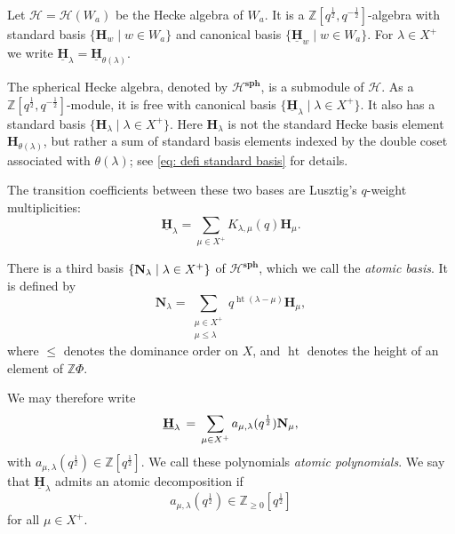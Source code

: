 Let $\mathcal{H}=\mathcal{H}(W_a)$ be the Hecke algebra of $W_a$. It is a $\mathbb{Z}[q^{\frac{1}{2}},q^{-\frac{1}{2}}]$-algebra with standard basis $\{\mathbf{H}_w\mid w\in W_a\}$ and canonical basis $\{\underline{\mathbf{H}}_w\mid w\in W_a\}$. For $\lambda\in X^+$ we write $\underline{\mathbf{H}}_\lambda=\underline{\mathbf{H}}_{\theta(\lambda)}$.

The spherical Hecke algebra, denoted by $\mathcal{H}^{\textbf{sph}}$, is a submodule of $\mathcal{H}$. As a $\mathbb{Z}[q^{\frac{1}{2}},q^{-\frac{1}{2}}]$-module, it is free with canonical basis $\{\underline{\mathbf{H}}_\lambda\mid \lambda\in X^+\}$. It also has a standard basis $\{\mathbf{H}_\lambda\mid \lambda\in X^+\}$. Here $\mathbf{H}_\lambda$ is not the standard Hecke basis element $\mathbf{H}_{\theta(\lambda)}$, but rather a sum of standard basis elements indexed by the double coset associated with $\theta(\lambda)$; see \cref{eq: defi standard basis} for details.

The transition coefficients between these two bases are Lusztig's $q$-weight multiplicities:
\begin{equation} \label{eq: intro A}
    \underline{\mathbf{H}}_{\lambda} =\sum_{\mu \in X^+}  K_{\lambda,\mu}(q) \mathbf{H}_\mu . 
\end{equation}

There is a third basis $\{\mathbf{N}_\lambda\mid \lambda\in X^+\}$ of $\mathcal{H}^{\textbf{sph}}$, which we call the \emph{atomic basis}. It is defined by
\begin{equation}  \label{eq: intro B}
\mathbf{N}_{\lambda}
= \sum_{\substack{\mu \in X^{+}\\ \mu \le \lambda}}
  q^{\operatorname{ht}(\lambda-\mu)}  \mathbf{H}_{\mu},
\end{equation}
where $\leq$ denotes the dominance order on $X$, and $\operatorname{ht}$ denotes the height of an element of $\mathbb{Z}\Phi$.

We may therefore write
\begin{equation} \label{eq: intro C}
    \underline{\mathbf{H}}_\lambda \,=\,\sum_{\mu\in X^{+}} a_{\mu , \lambda}(q^{\frac{1}{2}})  \mathbf{N}_\mu ,
\end{equation}
with $a_{\mu,\lambda}(q^{\frac{1}{2}})\in \mathbb{Z}[q^{\frac{1}{2}}]$. We call these polynomials \emph{atomic polynomials}. We say that $\underline{\mathbf{H}}_\lambda$ admits an atomic decomposition if
\[
    a_{\mu,\lambda}(q^{\frac{1}{2}})\in \mathbb{Z}_{\geq 0}[q^{\frac{1}{2}}]
\]
for all $\mu\in X^+$.

